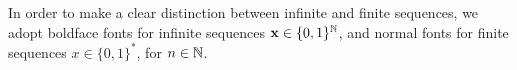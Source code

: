 In order to make a clear distinction between infinite and finite sequences, we adopt boldface fonts for infinite sequences ${\bf x} \in \{0,1\}^{\mathbb{N}}$, and normal fonts for finite sequences $x \in \{0,1\}^\ast$, for $n \in \mathbb{N}$.
